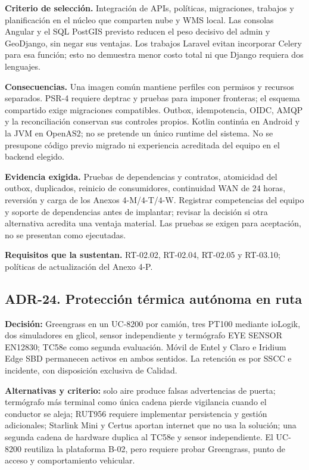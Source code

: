 \textbf{Criterio de selección.} Integración de APIs, políticas, migraciones, trabajos y planificación en el núcleo que comparten nube y WMS local. Las consolas Angular y el SQL PostGIS previsto reducen el peso decisivo del admin y GeoDjango, sin negar sus ventajas. Los trabajos Laravel evitan incorporar Celery para esa función; esto no demuestra menor costo total ni que Django requiera dos lenguajes.

\textbf{Consecuencias.} Una imagen común mantiene perfiles con permisos y recursos separados. PSR-4 requiere deptrac y pruebas para imponer fronteras; el esquema compartido exige migraciones compatibles. Outbox, idempotencia, OIDC, AMQP y la reconciliación conservan sus controles propios. Kotlin continúa en Android y la JVM en OpenAS2; no se pretende un único runtime del sistema. No se presupone código previo migrado ni experiencia acreditada del equipo en el backend elegido.

\textbf{Evidencia exigida.} Pruebas de dependencias y contratos, atomicidad del outbox, duplicados, reinicio de consumidores, continuidad WAN de 24 horas, reversión y carga de los Anexos 4-M/4-T/4-W. Registrar competencias del equipo y soporte de dependencias antes de implantar; revisar la decisión si otra alternativa acredita una ventaja material. Las pruebas se exigen para aceptación, no se presentan como ejecutadas.

\textbf{Requisitos que la sustentan.} RT-02.02, RT-02.04, RT-02.05 y RT-03.10; políticas de actualización del Anexo 4-P.

\subsection*{ADR-24. Protección térmica autónoma en ruta}
\textbf{Decisión:} Greengrass en un UC-8200 por camión, tres PT100 mediante ioLogik, dos simuladores en glicol, sensor independiente y termógrafo EYE SENSOR EN12830; TC58e como segunda evaluación. Móvil de Entel y Claro e Iridium Edge SBD permanecen activos en ambos sentidos. La retención es por SSCC e incidente, con disposición exclusiva de Calidad.

\textbf{Alternativas y criterio:} solo aire produce falsas advertencias de puerta; termógrafo más terminal como única cadena pierde vigilancia cuando el conductor se aleja; RUT956 requiere implementar persistencia y gestión adicionales; Starlink Mini y Certus aportan internet que no usa la solución; una segunda cadena de hardware duplica al TC58e y sensor independiente. El UC-8200 reutiliza la plataforma B-02, pero requiere probar Greengrass, punto de acceso y comportamiento vehicular.


